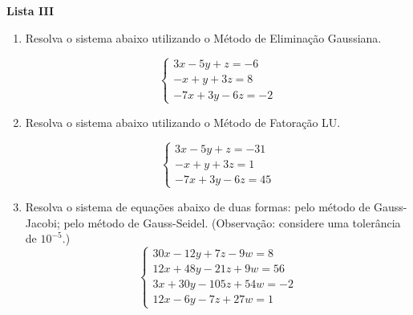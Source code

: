 \documentclass[12pt,a4paper]{article}
\begin{document}
\begin{center}
  \textbf{Lista III}
\end{center}

\begin{enumerate}
  
  \item Resolva o sistema abaixo utilizando o Método de Eliminação Gaussiana.

  $$%
   \begin{cases}
    3x - 5y + z = -6 \\
    -x + y + 3z = 8 \\
    -7x + 3y - 6z = -2
   \end{cases}
  $$

  \item Resolva o sistema abaixo utilizando o Método de Fatoração LU.

  $$%
   \begin{cases}
    3x - 5y + z = -31 \\
    -x + y + 3z = 1 \\
    -7x + 3y - 6z = 45
   \end{cases}
  $$
  
  \item Resolva o sistema de equações abaixo de duas formas: pelo método de Gauss-Jacobi; pelo
  método de Gauss-Seidel. (Observação: considere uma tolerância de $10^{-5}$.)
  $$%
   \begin{cases}
    30x - 12y + 7z - 9w = 8 \\
    12x + 48y - 21z + 9w = 56 \\
    3x + 30y - 105z + 54w = -2 \\
    12x - 6y - 7z + 27w = 1
   \end{cases}
  $$

\end{enumerate}
\end{document}
